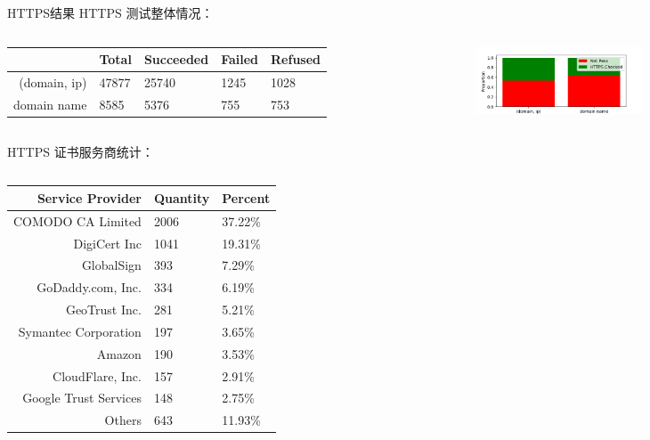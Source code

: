 \documentclass{beamer}
\begin{document}
  \begin{frame}{HTTPS结果}
    HTTPS 测试整体情况：
    \begin{columns}
      \begin{column}{0.5\textwidth}
        \begin{table}
          \tiny
        \begin{tabular}{r|l|l|l|l}
          \toprule
                  & Total & Succeeded & Failed &  Refused \\
          \midrule
          (domain, ip) & 47877& 25740 & 1245 &1028\\
          domain name&   8585&5376& 755 &753\\
          \bottomrule
          \end{tabular}
        \end{table}
      \end{column}
      \begin{column}{0.5\textwidth}
        \begin{figure}
          \includegraphics[height=2cm]{images/figure/figure_httpscheck.png}
          \end{figure}
      \end{column}
      \end{columns}
HTTPS 证书服务商统计：
\begin{columns}
      
  \begin{column}{0.5\textwidth}
    \begin{table}
      \tiny
    \begin{tabular}{r|l|l}
      \toprule
      Service Provider &Quantity & Percent\\
      \midrule
      COMODO CA Limited&2006 & 37.22\%\\
      DigiCert Inc&1041& 19.31\%\\
      GlobalSign &393& 7.29\%\\
      GoDaddy.com, Inc.&334& 6.19\%\\
      GeoTrust Inc.&281& 5.21\%\\
      Symantec Corporation&197& 3.65\%\\
      Amazon&190& 3.53\%\\
      CloudFlare, Inc.&157& 2.91\%\\
      Google Trust Services&148& 2.75\%\\
      Others & 643& 11.93\%\\
      \bottomrule
      \end{tabular}
    \end{table}


\end{column}
\end{columns}
\end{frame}
\end{document}
